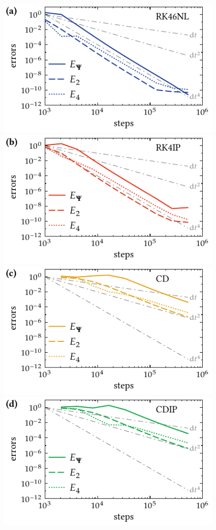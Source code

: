 \begin{figure}
    \includegraphics{figures_generated/test/convergence_gpe_RK46NL.pdf}%
    \includegraphics{figures_generated/test/convergence_gpe_RK4IP.pdf}\\%
    \includegraphics{figures_generated/test/convergence_gpe_CD.pdf}%
    \includegraphics{figures_generated/test/convergence_gpe_CDIP.pdf}%


\end{figure}
